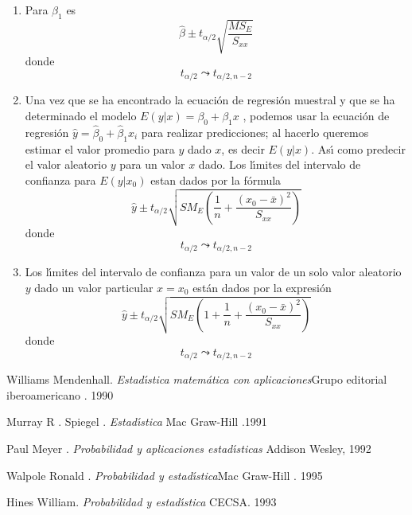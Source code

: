 \begin{enumerate}
\item Para $\beta_{1}$ es
\[
\hat{\beta}\pm t_{\alpha/2}\sqrt{\frac{MS_{E}}{S_{xx}}}%
\]
donde
\[
t_{\alpha/2}\leadsto t_{\alpha/2,n-2}%
\]

\item Una vez que se ha encontrado la ecuaci\'{o}n de regresi\'{o}n muestral y
que se ha determinado el modelo $E\left(  y|x\right)  =\beta_{0}+\beta_{1}x $
, podemos usar la ecuaci\'{o}n de regresi\'{o}n $\hat{y}=\hat{\beta}_{0}%
+\hat{\beta}_{1}x_{i}$ para realizar predicciones; al hacerlo queremos estimar
el valor promedio para $y$ dado $x$, es decir $E\left(  y|x\right)  .$
As\'{\i} como predecir el valor aleatorio $y$ para un valor $x$ dado.\newline
Los l\'{\i}mites del intervalo de confianza para $E\left(  y|x_{0}\right)  $
estan dados por la f\'{o}rmula
\[
\hat{y}\pm t_{\alpha/2}\sqrt{SM_{E}\left(  \frac{1}{n}+\frac{\left(
x_{0}-\bar{x}\right)  ^{2}}{S_{xx}}\right)  }%
\]
donde
\[
t_{\alpha/2}\leadsto t_{\alpha/2,n-2}%
\]

\item Los l\'{\i}mites del intervalo de confianza para un valor de un solo
valor aleatorio $y$ dado un valor particular $x=x_{0}$ est\'{a}n dados por la
expresi\'{o}n
\[
\hat{y}\pm t_{\alpha/2}\sqrt{SM_{E}\left(  1+\frac{1}{n}+\frac{\left(
x_{0}-\bar{x}\right)  ^{2}}{S_{xx}}\right)  }%
\]
donde
\[
t_{\alpha/2}\leadsto t_{\alpha/2,n-2}%
\]
\end{enumerate}

\begin{thebibliography}{9}                                                                                                %
\bibitem {}Williams Mendenhall. \emph{Estad\'{\i}stica matem\'{a}tica con
aplicaciones}\newline Grupo editorial iberoamericano . 1990

\bibitem {}Murray R . Spiegel . \emph{Estad\'{\i}stica} Mac Graw-Hill .1991

\bibitem {}Paul Meyer . \emph{Probabilidad y aplicaciones estad\'{\i}sticas}%
\newline Addison Wesley, 1992

\bibitem {}Walpole Ronald . \emph{Probabilidad y estad\'{\i}stica}\newline Mac
Graw-Hill . 1995

\bibitem {}Hines William. \emph{Probabilidad y estad\'{\i}stica}%
\newline CECSA. 1993
\end{thebibliography}